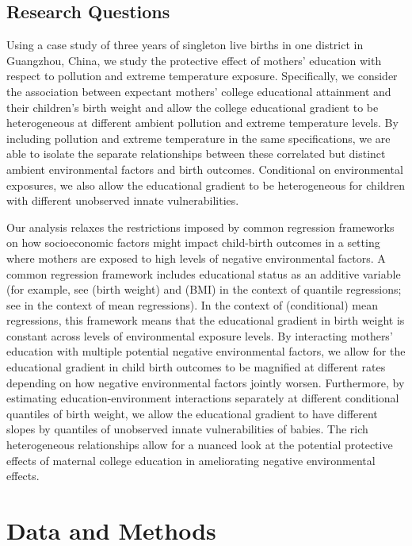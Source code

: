 \subsection{Research Questions}

Using a case study of three years of singleton live births in one district in
Guangzhou, China, we study the protective effect of mothers' education
with respect to pollution and extreme temperature exposure. Specifically, we consider the
association between expectant mothers' college educational attainment
and their children's birth weight and allow the college educational gradient to be
heterogeneous at different ambient pollution and extreme temperature
levels. By including pollution and extreme temperature in the same specifications, we are able to isolate the separate relationships between these correlated but distinct ambient environmental factors and birth outcomes. Conditional on environmental exposures, we also allow the
educational gradient to be heterogeneous for children with different
unobserved innate vulnerabilities.

Our analysis relaxes the restrictions imposed by common regression
frameworks on how socioeconomic factors might impact child-birth
outcomes in a setting where mothers are exposed to high levels of
negative environmental factors. A common regression
framework includes educational status as an additive variable (for
example, see \textcite{koenker_quantile_2001} (birth weight) and \textcite{hanandita_double_2015} (BMI) in the context of quantile
regressions; see \textcite{bharadwaj_atmospheric_2008} in the context of mean
regressions). In the context of (conditional) mean regressions, this
framework means that the educational gradient in birth weight is
constant across levels of environmental exposure levels. By interacting
mothers' education with multiple potential negative environmental
factors, we allow for the educational gradient in child birth outcomes
to be magnified at different rates depending on how negative
environmental factors jointly worsen. Furthermore, by estimating
education-environment interactions separately at different conditional
quantiles of birth weight, we allow the educational gradient to have
different slopes by quantiles of unobserved innate
vulnerabilities of babies. The rich heterogeneous relationships allow
for a nuanced look at the potential protective effects of maternal college education in ameliorating negative environmental effects.


\section{Data and Methods\label{sec:datamethods}}

